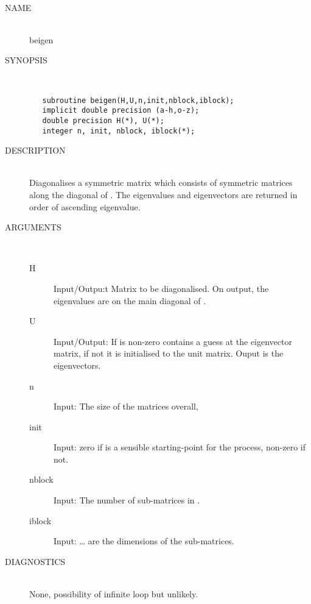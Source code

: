\begin{minipage}{4.5in}
\ \\
\begin{description}
\item[NAME]  \      \\
beigen
\item[SYNOPSIS] \ \\
\begin{verbatim}
   subroutine beigen(H,U,n,init,nblock,iblock);
   implicit double precision (a-h,o-z);
   double precision H(*), U(*);
   integer n, init, nblock, iblock(*);

\end{verbatim}
\item[DESCRIPTION] \ \\
Diagonalises a symmetric matrix which consists of 
symmetric matrices along the diagonal of . The eigenvalues and
eigenvectors are returned in order of ascending eigenvalue.
\item[ARGUMENTS] \  \\
\begin{description}
\item[H] Input/Outpu:t Matrix to be diagonalised. On output, the
eigenvalues are on the main diagonal of .
\item[U] Input/Output: If  is non-zero  contains a
guess at
the eigenvector matrix, if not it is initialised to the unit matrix.
Ouput is the eigenvectors.
\item[n] Input: The size of the matrices overall,
\item[init] Input: zero if  is a sensible starting-point for the
process, non-zero if not.
\item[nblock] Input: The number of sub-matrices in .
\item[iblock] Input:  \ldots {} are the
dimensions of the sub-matrices.
\end{description}

\item[DIAGNOSTICS] \  \\
None, possibility of infinite loop but unlikely.
\ \\ \ \\
\end{description}
\end{minipage}
\clearpage



